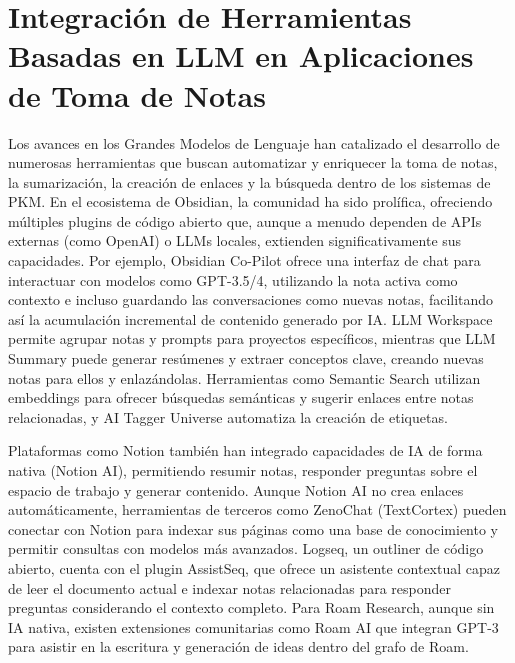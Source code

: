 \section{Integración de Herramientas Basadas en LLM en Aplicaciones de Toma de Notas}
\label{sec:integracion_llm_pkm}
Los avances en los Grandes Modelos de Lenguaje han catalizado el desarrollo de numerosas herramientas que buscan automatizar y enriquecer la toma de notas, la sumarización, la creación de enlaces y la búsqueda dentro de los sistemas de PKM. En el ecosistema de Obsidian, la comunidad ha sido prolífica, ofreciendo múltiples plugins de código abierto que, aunque a menudo dependen de APIs externas (como OpenAI) o LLMs locales, extienden significativamente sus capacidades. Por ejemplo, Obsidian Co-Pilot ofrece una interfaz de chat para interactuar con modelos como GPT-3.5/4, utilizando la nota activa como contexto e incluso guardando las conversaciones como nuevas notas, facilitando así la acumulación incremental de contenido generado por IA. LLM Workspace permite agrupar notas y prompts para proyectos específicos, mientras que LLM Summary puede generar resúmenes y extraer conceptos clave, creando nuevas notas para ellos y enlazándolas. Herramientas como Semantic Search utilizan embeddings para ofrecer búsquedas semánticas y sugerir enlaces entre notas relacionadas, y AI Tagger Universe automatiza la creación de etiquetas.

Plataformas como Notion también han integrado capacidades de IA de forma nativa (Notion AI), permitiendo resumir notas, responder preguntas sobre el espacio de trabajo y generar contenido. Aunque Notion AI no crea enlaces automáticamente, herramientas de terceros como ZenoChat (TextCortex) pueden conectar con Notion para indexar sus páginas como una base de conocimiento y permitir consultas con modelos más avanzados. Logseq, un outliner de código abierto, cuenta con el plugin AssistSeq, que ofrece un asistente contextual capaz de leer el documento actual e indexar notas relacionadas para responder preguntas considerando el contexto completo. Para Roam Research, aunque sin IA nativa, existen extensiones comunitarias como Roam AI que integran GPT-3 para asistir en la escritura y generación de ideas dentro del grafo de Roam.

